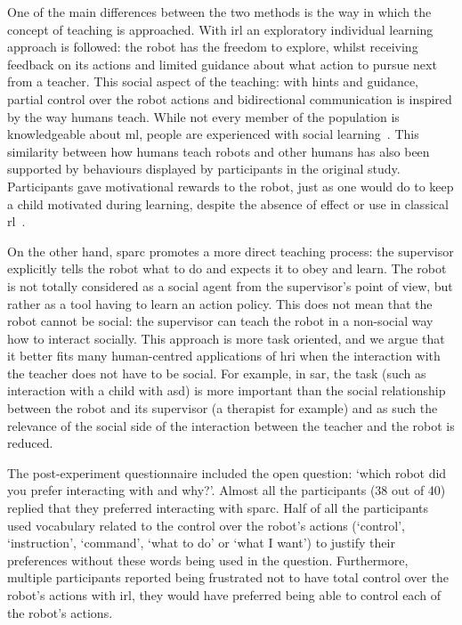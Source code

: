 One of the main differences between the two methods is the way in which the concept of teaching is approached. With \gls{irl} an exploratory individual learning approach is followed: the robot has the freedom to explore, whilst receiving feedback on its actions and limited guidance about what action to pursue next from a teacher. This social aspect of the teaching: with hints and guidance, partial control over the robot actions and bidirectional communication is inspired by the way humans teach. While not every member of the population is knowledgeable about \gls{ml}, people are experienced with social learning~\citep{thomaz2008teachable}. This similarity between how humans teach robots and other humans has also been supported by behaviours displayed by participants in the original study. Participants gave motivational rewards to the robot, just as one would do to keep a child motivated during learning, despite the absence of effect or use in classical \gls{rl}~\citep{thomaz2008teachable}.

On the other hand, \gls{sparc} promotes a more direct teaching process: the supervisor explicitly tells the robot what to do and expects it to obey and learn. The robot is not totally considered as a social agent from the supervisor's point of view, but rather as a tool having to learn an action policy. This does not mean that the robot cannot be social: the supervisor can teach the robot in a non-social way how to interact socially. This approach is more task oriented, and we argue that it better fits many human-centred applications of \gls{hri} when the interaction with the teacher does not have to be social. For example, in \gls{sar}, the task (such as interaction with a child with \gls{asd}) is more important than the social relationship between the robot and its supervisor (a therapist for example) and as such the relevance of the social side of the interaction between the teacher and the robot is reduced.

The post-experiment questionnaire included the open question: `which robot did you prefer interacting with and why?'. Almost all the participants (38 out of 40) replied that they preferred interacting with \gls{sparc}. Half of all the participants used vocabulary related to the control over the robot's actions (`control', `instruction', `command', `what to do' or `what I want') to justify their preferences without these words being used in the question. Furthermore, multiple participants reported being frustrated not to have total control over the robot's actions with \gls{irl}, they would have preferred being able to control each of the robot's actions. 

